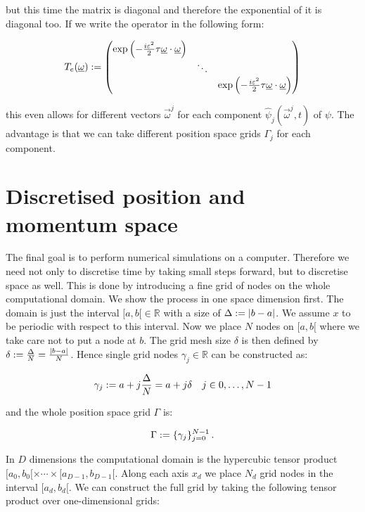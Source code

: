 but this time the matrix is diagonal and therefore the exponential of it is diagonal
too. If we write the operator in the following form:

\begin{equation}
    T_e(\underline{\omega}) :=
    \begin{pmatrix}
      \exp\left(-\frac{i\varepsilon^2}{2} \tau\underline{\omega}\cdot\underline{\omega}\right) & {} & {} \\
      {} & \ddots & {} \\
      {} & {} & \exp\left(-\frac{i\varepsilon^2}{2} \tau\underline{\omega}\cdot\underline{\omega}\right)
    \end{pmatrix}
\end{equation}

this even allows for different vectors $\vec{\omega}^j$ for each component
$\hat{\psi}_j\left(\vec{\omega}^j,t\right)$ of $\psi$. The advantage is that
we can take different position space grids $\Gamma_j$ for each component.


\section{Discretised position and momentum space}


The final goal is to perform numerical simulations on a computer. Therefore
we need not only to discretise time by taking small steps forward, but
to discretise space as well. This is done by introducing a fine grid of nodes
on the whole computational domain. We show the process in one space dimension
first. The domain is just the interval $[a,b[ \in \mathbb{R}$ with a size
of $\Delta := |b-a|$. We assume $x$ to be periodic with respect to this
interval. Now we place $N$ nodes on $[a,b[$ where we take care not to put a
node at $b$. The grid mesh size $\delta$ is then defined by
$\delta := \frac{\Delta}{N} = \frac{|b-a|}{N}$. Hence single grid nodes
$\gamma_j \in \mathbb{R}$ can be constructed as:

\begin{equation}
  \gamma_j := a + j \frac{\Delta}{N} = a + j \delta \quad j \in 0, \ldots, N-1
\end{equation}

and the whole position space grid $\Gamma$ is:

\begin{equation}
  \Gamma := \{\gamma_j\}_{j=0}^{N-1} \,.
\end{equation}

In $D$ dimensions the computational domain is the hypercubic tensor product
$[a_0, b_0[ \times \cdots \times [a_{D-1},b_{D-1}[$. Along each axis $x_d$
we place $N_d$ grid nodes in the interval $[a_d, b_d[$. We can construct the
full grid by taking the following tensor product over one-dimensional grids:

